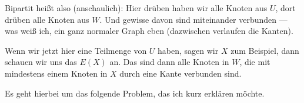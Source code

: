 \begin{ai-global-state-checkpoint-invisible-content}
\end{ai-global-state-checkpoint-invisible-content}

\begin{math-stroke}
\end{math-stroke}

\begin{spoken-clean}[01:03:23 - 01:04:39]
Bipartit heißt also (anschaulich): Hier drüben haben wir alle Knoten aus $U$, dort drüben alle Knoten aus $W$.  Und gewisse davon sind miteinander verbunden --- was weiß ich, ein ganz normaler Graph eben (dazwischen verlaufen die Kanten).

Wenn wir jetzt hier eine Teilmenge von $U$ haben, sagen wir $X$ zum Beispiel, dann schauen wir uns das $E(X)$ an. Das sind dann alle Knoten in $W$, die mit mindestens einem Knoten in $X$ durch eine Kante verbunden sind.

Es geht hierbei um das folgende Problem, das ich kurz erklären möchte. 
\end{spoken-clean}

